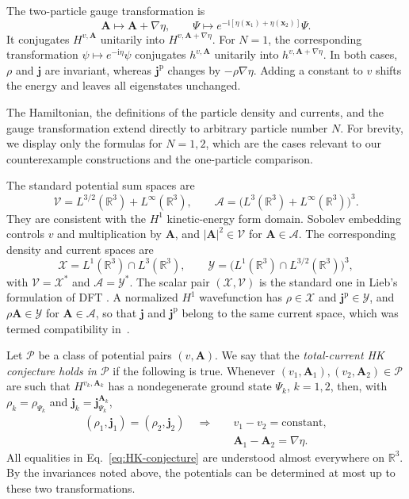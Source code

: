 \documentclass[11pt,a4paper]{article}
\theoremstyle{remark}
\theoremstyle{plain}
\newcommand{\R}{\mathbb R}
\newcommand{\jp}{\mathbf j^{\mathrm p}}
\newcommand{\jj}{\mathbf j}
\newcommand{\A}{\mathbf A}
\begin{document}
The two-particle gauge transformation is
\begin{equation*}
 \A\mapsto\A+\nabla\eta,\qquad
 \Psi\mapsto e^{-\mathrm{i}[\eta(\mathbf x_1)+\eta(\mathbf x_2)]}\Psi.
\end{equation*}
It conjugates $H^{v,\A}$ unitarily into $H^{v,\A+\nabla\eta}$.
For $N=1$, the corresponding transformation
$\psi\mapsto e^{-\mathrm{i}\eta}\psi$ conjugates $h^{v,\A}$ unitarily into
$h^{v,\A+\nabla\eta}$. In both cases, $\rho$ and $\jj$ are invariant,
whereas $\jp$ changes by $-\rho\nabla\eta$.
Adding a constant to $v$ shifts the energy and leaves all eigenstates
unchanged.

The Hamiltonian, the definitions of the particle density and currents,
and the gauge transformation extend directly to arbitrary particle
number $N$. For brevity, we display only the formulas for $N=1,2$,
which are the cases relevant to our counterexample constructions and
the one-particle comparison.

The standard potential sum spaces are
\cite{Laestadius2014,Laestadius2019}
\begin{equation}
 \mathcal V=L^{3/2}(\R^3)+L^\infty(\R^3),\qquad
 \mathcal A=\bigl(L^3(\R^3)+L^\infty(\R^3)\bigr)^3.
 \label{eq:spaces}
\end{equation}
They are consistent with the $H^1$ kinetic-energy form domain.
Sobolev embedding controls $v$ and multiplication by $\A$, and
$|\A|^2\in\mathcal V$ for $\A\in\mathcal A$.
The corresponding density and current spaces are
\begin{equation*}
 \mathcal X=L^1(\R^3)\cap L^3(\R^3),\qquad
 \mathcal Y=\bigl(L^1(\R^3)\cap L^{3/2}(\R^3)\bigr)^3,
\end{equation*}
with $\mathcal V=\mathcal X^*$ and $\mathcal A=\mathcal Y^*$.
The scalar pair $(\mathcal X,\mathcal V)$ is the standard one in
Lieb's formulation of DFT \cite{Lieb1983}. A normalized $H^1$
wavefunction has $\rho\in\mathcal X$ and $\jp\in\mathcal Y$, and
$\rho\A\in\mathcal Y$ for $\A\in\mathcal A$, so that $\jj$ and $\jp$
belong to the same current space, which was 
termed compatibility in~\cite{Laestadius2019}.

Let $\mathcal P$ be a class of potential pairs $(v,\A)$. We say that
the \emph{total-current HK conjecture holds in $\mathcal P$} if the
following is true. Whenever $(v_1,\A_1),(v_2,\A_2)\in\mathcal P$ are
such that $H^{v_k,\A_k}$ has a nondegenerate ground state $\Psi_k$,
$k=1,2$, then, with $\rho_k=\rho_{\Psi_k}$ and
$\jj_k=\jj_{\Psi_k}^{\A_k}$,
\begin{equation}
 \begin{aligned}
 (\rho_1,\jj_1)=(\rho_2,\jj_2)\quad\Longrightarrow\quad
 &v_1-v_2=\text{constant},\\
 &\A_1-\A_2=\nabla\eta.
 \end{aligned}
 \label{eq:HK-conjecture}
\end{equation}
All equalities in Eq.~\eqref{eq:HK-conjecture} are understood almost
everywhere on $\R^3$.
By the invariances noted above, the potentials can be determined at most
up to these two transformations.
\end{document}
